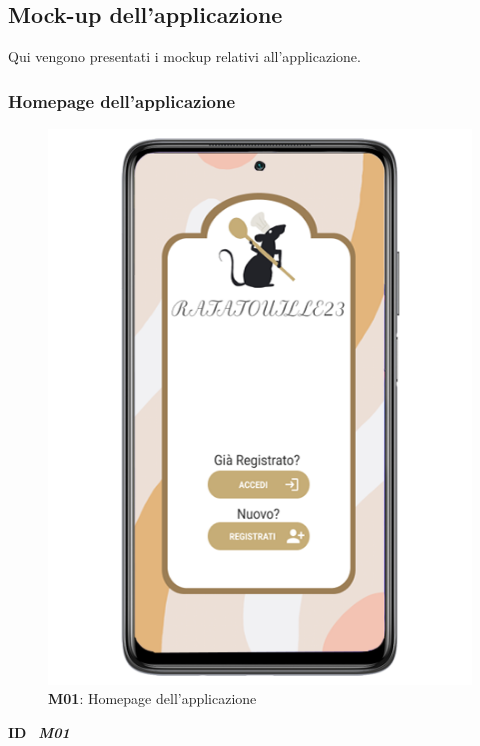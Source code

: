 \subsection{Mock-up dell'applicazione}
    \begin{flushleft}
        Qui vengono presentati i mockup relativi all'applicazione.
    \end{flushleft}
    \subsubsection{Homepage dell'applicazione}
        \begin{figure}[H]
          \centering
          \includegraphics[scale=2.5]{assets/Mockup/Mockup_Homepage.png}
          \caption{\textbf{M01}: Homepage dell'applicazione}\label{fig:Mockup_Homepage}
        \end{figure}
        \begin{flushleft}
            \textbf{ID} \ \Large{\textit{\textbf{M01}}}\\
        \end{flushleft}

